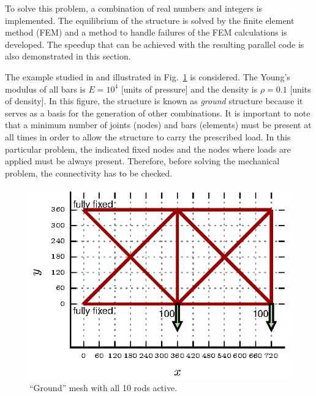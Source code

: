\documentclass[final,5p,times,twocolumn]{elsarticle}
\newcommand{\figname} {Fig.}
\begin{document}
To solve this problem, a combination of real numbers and integers is implemented. The equilibrium of
the structure is solved by the finite element method (FEM) and a method to handle failures of the
FEM calculations is developed. The speedup that can be achieved with the resulting parallel code is
also demonstrated in this section.

The example studied in \citep{ruy:01, deb:01a, wu:10, noi:13, cazacu:14} and illustrated in
\figname~\ref{fig:truss} is considered. The Young's modulus of all bars is $E=10^4$ [units of
pressure] and the density is $\rho=0.1$ [units of density]. In this figure, the structure is known
as \emph{ground} structure because it serves as a basis for the generation of other combinations. It
is important to note that a minimum number of joints (nodes) and bars (elements) must be present at
all times in order to allow the structure to carry the prescribed load. In this particular problem,
the indicated fixed nodes and the nodes where loads are applied must be always present. Therefore,
before solving the mechanical problem, the connectivity has to be checked.

\begin{figure} \centering
\includegraphics[scale=1]{./figs/mesh-ground10.eps}
\caption{``Ground'' mesh with all 10 rods active.}
\label{fig:truss}
\end{figure}
\end{document}
